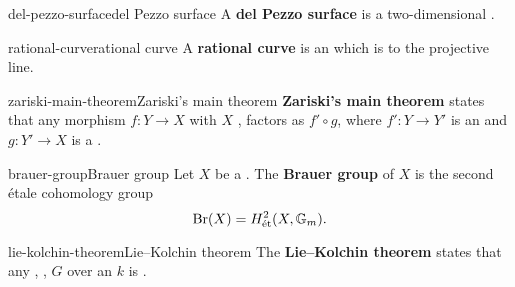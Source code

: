 \begin{topic}{del-pezzo-surface}{del Pezzo surface}
    A \textbf{del Pezzo surface} is a two-dimensional .
\end{topic}


\begin{topic}{rational-curve}{rational curve}
    A \textbf{rational curve} is an  which is  to the projective line.
\end{topic}

\begin{topic}{zariski-main-theorem}{Zariski's main theorem}
    \textbf{Zariski's main theorem} states that any   morphism $f : Y \to X$ with $X$ , factors as $f' \circ g$, where $f' : Y \to Y'$ is an  and $g : Y' \to X$ is a .
\end{topic}

\begin{topic}{brauer-group}{Brauer group}
    Let $X$ be a . The \textbf{Brauer group} of $X$ is the second étale cohomology group
    \[ \textup{Br}(X) = H^2_\textup{ét}(X, \mathbb{G}_m) . \]
\end{topic}

\begin{topic}{lie-kolchin-theorem}{Lie--Kolchin theorem}
    The \textbf{Lie--Kolchin theorem} states that any , ,   $G$ over an  $k$ is .
\end{topic}

